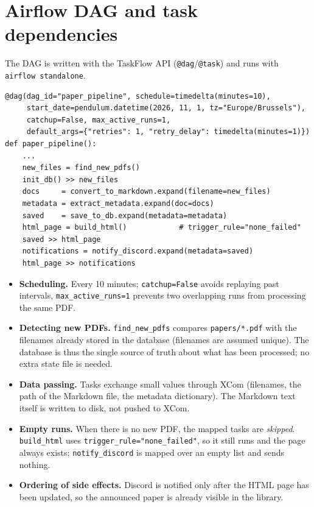 \documentclass[11pt,a4paper]{article}
\begin{document}
\section{Airflow DAG and task dependencies}
The DAG is written with the TaskFlow API (\texttt{@dag}/\texttt{@task}) and runs with
\texttt{airflow standalone}.
\begin{lstlisting}
@dag(dag_id="paper_pipeline", schedule=timedelta(minutes=10),
     start_date=pendulum.datetime(2026, 11, 1, tz="Europe/Brussels"),
     catchup=False, max_active_runs=1,
     default_args={"retries": 1, "retry_delay": timedelta(minutes=1)})
def paper_pipeline():
    ...
    new_files = find_new_pdfs()
    init_db() >> new_files
    docs     = convert_to_markdown.expand(filename=new_files)
    metadata = extract_metadata.expand(doc=docs)
    saved    = save_to_db.expand(metadata=metadata)
    html_page = build_html()            # trigger_rule="none_failed"
    saved >> html_page
    notifications = notify_discord.expand(metadata=saved)
    html_page >> notifications
\end{lstlisting}
\begin{itemize}
  \item \textbf{Scheduling.} Every 10 minutes; \texttt{catchup=False} avoids replaying past intervals,
        \texttt{max\_active\_runs=1} prevents two overlapping runs from processing the same PDF.
  \item \textbf{Detecting new PDFs.} \texttt{find\_new\_pdfs} compares \texttt{papers/*.pdf} with the
        filenames already stored in the database (filenames are assumed unique). The database is thus
        the single source of truth about what has been processed; no extra state file is needed.
  \item \textbf{Data passing.} Tasks exchange small values through XCom (filenames, the path of the
        Markdown file, the metadata dictionary). The Markdown text itself is written to disk, not pushed to XCom.
  \item \textbf{Empty runs.} When there is no new PDF, the mapped tasks are \emph{skipped}.
        \texttt{build\_html} uses \texttt{trigger\_rule="none\_failed"}, so it still runs and the page
        always exists; \texttt{notify\_discord} is mapped over an empty list and sends nothing.
  \item \textbf{Ordering of side effects.} Discord is notified only after the HTML page has been updated,
        so the announced paper is already visible in the library.
\end{itemize}
\end{document}
